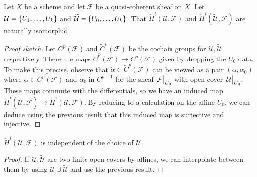 \begin{lemma}
	Let \( X \) be a scheme and let \( \mathcal F \) be a quasi-coherent sheaf on \( X \).
	Let \( \mathcal U = \qty{U_1, \dots, U_k} \) and \( \widetilde{\mathcal U} = \qty{U_0, \dots, U_k} \).
	That \( \check H^i(\mathcal U, \mathcal F) \) and \( \check H^i(\widetilde{\mathcal U}, \mathcal F) \) are naturally isomorphic.
\end{lemma}
\begin{proof}[Proof sketch]
	Let \( C^p(\mathcal F) \) and \( \widetilde C^p(\mathcal F) \) be the cochain groups for \( \mathcal U, \widetilde{\mathcal U} \) respectively.
	There are maps \( \widetilde C^p(\mathcal F) \to C^p(\mathcal F) \) given by dropping the \( U_0 \) data.
	To make this precise, observe that \( \widetilde \alpha \in \widetilde C^p(\mathcal F) \) can be viewed as a pair \( (\alpha, \alpha_0) \) where \( \alpha \in C^p(\mathcal F) \) and \( \alpha_0 \) in \( C^{p-1} \) for the sheaf \( \eval{\mathcal F}_{U_0} \) with open cover \( \eval{\mathcal U}_{U_0} \).
	These maps commute with the differentials, so we have an induced map \( \check{H}^i(\widetilde{\mathcal U}, \mathcal F) \to \check{H}^i(\mathcal U, \mathcal F) \).
	By reducing to a calculation on the affine \( U_0 \), we can deduce using the previous result that this induced map is surjective and injective.
\end{proof}
\begin{corollary}
	\( \check{H}^i(\mathcal U, \mathcal F) \) is independent of the choice of \( \mathcal U \).
\end{corollary}
\begin{proof}
	If \( \mathcal U, \widetilde{\mathcal U} \) are two finite open covers by affines, we can interpolate between them by using \( \mathcal U \cup \widetilde{\mathcal U} \) and use the previous result.
\end{proof}

